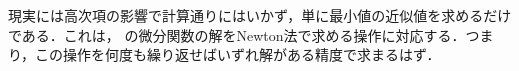 \documentclass{article}
\begin{document}
\begin{maplelatex}\begin{center}
\begin{Maple Normal}{
}\end{Maple Normal}
\end{center}
\end{maplelatex}
\begin{maplelatex}\begin{center}
\begin{Maple Normal}{
}\end{Maple Normal}
\end{center}
\end{maplelatex}
\begin{maplelatex}\begin{Maple Normal}{
現実には高次項の影響で計算通りにはいかず，単に最小値の近似値を求めるだけである．これは，
の微分関数の解をNewton法で求める操作に対応する．つまり，この操作を何度も繰り返せばいずれ解がある精度で求まるはず．}\end{Maple Normal}
\end{maplelatex}
\end{document}

